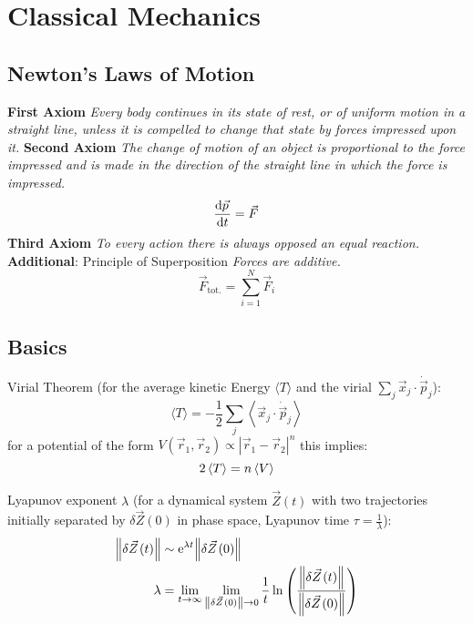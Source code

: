 \section{Classical Mechanics}
	\subsection{Newton's Laws of Motion}
		\textbf{First Axiom} \newline
		\indent \textit{Every body continues in its state of rest, or of uniform motion in a straight line, unless it is compelled to change that state by forces impressed upon it.} \nl
		\textbf{Second Axiom} \newline
		\indent \textit{The change of motion of an object is proportional to the force impressed and is made in the direction of the straight line in which the force is impressed.}
		\begin{equation}
			\dv{\vec{p}}{t} = \vec{F}
		\end{equation}\nl
		\textbf{Third Axiom} \newline
		\indent \textit{To every action there is always opposed an equal reaction.} \nl
		\textbf{Additional}: Principle of Superposition \newline
		\indent \textit{Forces are additive.}
		\begin{equation}
			\vec{F}_{\text{tot.}} = \sum_{i=1}^{N} \vec{F}_i
		\end{equation}

	\subsection{Basics}
		\noindent
		Virial Theorem (for the average kinetic Energy $\langle T \rangle$ and the virial $\sum_j \vec{x}_j\cdot\dot{\vec{p}}_j$):
		\begin{equation}
			\langle T \rangle = - \frac{1}{2} \sum_j \left\langle \vec{x}_j\cdot\dot{\vec{p}}_j \right\rangle
		\end{equation}
		for a potential of the form $V(\vec{r}_1,\vec{r}_2) \propto |\vec{r}_1-\vec{r}_2|^n$ this implies:
		\begin{equation}
			2\left\langle T \right\rangle = n\left\langle V \right\rangle
		\end{equation}

		\noindent
		Lyapunov exponent $\lambda$ (for a dynamical system $\vec{Z}(t)$ with two trajectories initially separated by $\delta\vec{Z}(0)$ in phase space, Lyapunov time $\tau=\frac{1}{\lambda}$):
		\begin{equation}
			\begin{aligned}
				\norm{\delta\vec{Z}(t)} &\sim \ex^{\lambda t} \norm{\delta\vec{Z}(0)}\\
				\lambda &= \lim_{t\to\infty} \lim_{\norm{\delta\vec{Z}(0)}\to 0} \frac{1}{t} \ln\qty(\frac{\norm{\delta \vec{Z}(t)}}{\norm{\delta\vec{Z}(0)}}) \\
			\end{aligned}
		\end{equation}

